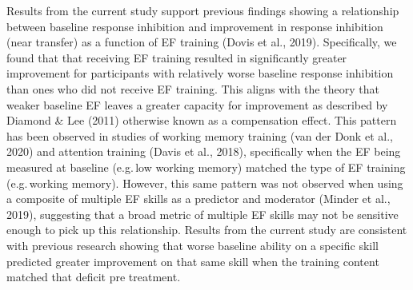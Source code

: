 \documentclass[
  letterpaper,
]{ut-thesis}
\begin{document}
Results from the current study support previous findings showing a
relationship between baseline response inhibition and improvement in
response inhibition (near transfer) as a function of EF training (Dovis
et al., 2019). Specifically, we found that that receiving EF training
resulted in significantly greater improvement for participants with
relatively worse baseline response inhibition than ones who did not
receive EF training. This aligns with the theory that weaker baseline EF
leaves a greater capacity for improvement as described by Diamond \& Lee
(2011) otherwise known as a compensation effect. This pattern has been
observed in studies of working memory training (van der Donk et al.,
2020) and attention training (Davis et al., 2018), specifically when the
EF being measured at baseline (e.g.\,low working memory) matched the
type of EF training (e.g.\,working memory). However, this same pattern
was not observed when using a composite of multiple EF skills as a
predictor and moderator (Minder et al., 2019), suggesting that a broad
metric of multiple EF skills may not be sensitive enough to pick up this
relationship. Results from the current study are consistent with
previous research showing that worse baseline ability on a specific
skill predicted greater improvement on that same skill when the training
content matched that deficit pre treatment.
\end{document}
